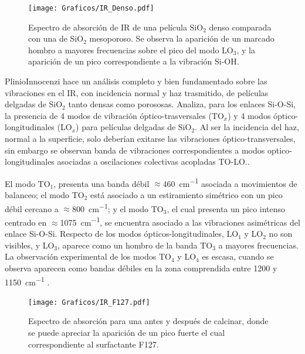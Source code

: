 			\begin{figure}[!ht]
						\begin{center}
						\texttt{[image: Graficos/IR\_Denso.pdf]}
						\caption[FTIR SiO$_2$ denso y SiO$_2$ mesoporoso.]{Espectro de absorción de IR de una película SiO$_2$ denso comparada con una de SiO$_2$ mesoporoso. Se observa la aparición de un marcado hombro a mayores frecuencias sobre el pico del modo LO$_3$, y la aparición de un pico correspondiente a la vibración Si-OH.}
						\label{fig:IR-denso}
						\end{center}
						\end{figure}

		PlinioInnocenzi\cite{Innocenzi2003} hace un análisis completo y bien fundamentado sobre las vibraciones en el IR, con incidencia normal y haz trasmitido, de películas delgadas de SiO$_2$ tanto densas como porososas. Analiza, para los enlaces Si-O-Si, la presencia de 4 modos de vibración óptico-trasversales (TO$_x$) y 4 modos óptico-longitudinales (LO$_x$) para películas delgadas de SiO$_2$. Al ser la incidencia del haz, normal a la superficie, solo deberían exitarse las vibraciones óptico-transversales, sin embargo se observan banda de vibraciones correspondientes a modos optico-longitudinales asociadas a oscilaciones colectivas acopladas TO-LO.\cite{Pai1986,Grosse1986,Innocenzi2003}.

		El modo TO$_1$, presenta una banda débil $\approx$\SI{460}{\cm^{-1}} asociada a movimientos de balanceo; el modo TO$_2$ está asociado a un estiramiento simétrico con un pico débil cercano a $\approx$\SI{800}{\cm^{-1}}; y el modo TO$_3$, el cual presenta un pico intenso centrado en $\approx$\SI{1075}{\cm^{-1}}, se encuentra asociado a las vibraciones asimétricas del enlace Si-O-Si. Respecto de los modos ópticos-longitudinales, LO$_1$ y LO$_2$ no son visibles, y LO$_3$, aparece como un hombro de la banda TO$_3$ a mayores frecuencias. La observación experimental de los modos TO$_4$ y LO$_4$ es escasa, cuando se observa aparecen como bandas débiles en la zona comprendida entre 1200 y \SI{1150}{\cm^{-1}} \cite{Pai1986,Grosse1986}.
		
				\begin{figure}[!ht]
						\begin{center}
						\texttt{[image: Graficos/IR\_F127.pdf]}
						\caption[FTIR para una \pdmF.]{Espectro de absorción para una \pdmF\space antes y después de calcinar, donde se puede apreciar la aparición de un pico fuerte el cual correspondiente al surfactante F127.}
						\label{fig:IR_F127_calciando}
						\end{center}
						\end{figure}
				
